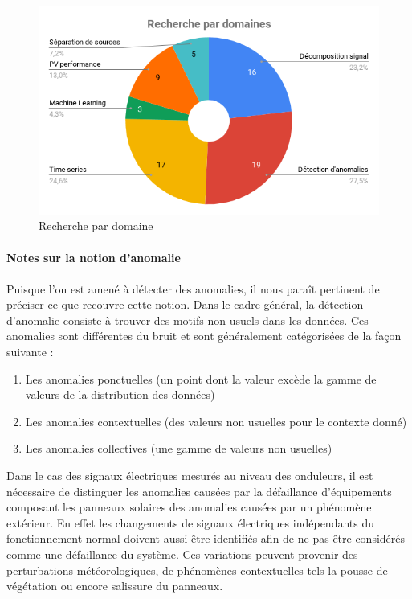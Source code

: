 \begin{figure}[!ht]
\begin{center}
\includegraphics[scale=0.5]{rapport/images/Ch3_RechercheParDomaines.png}
\end{center}
\caption{Recherche par domaine}
\label{fig: bibdo}
\end{figure}

\paragraph{Notes sur la notion d'anomalie}
\paragraph{}
Puisque l'on est amené à détecter des anomalies, il nous paraît pertinent de préciser ce que recouvre cette notion. Dans le cadre général, la détection d'anomalie consiste à trouver des motifs non usuels dans les données. Ces anomalies sont différentes du bruit et sont généralement catégorisées de la façon suivante :

\begin{enumerate}
\item Les anomalies ponctuelles (un point dont la valeur excède la gamme de valeurs de la distribution des données)
\item Les anomalies contextuelles (des valeurs non usuelles pour le contexte donné)
\item Les anomalies collectives (une gamme de valeurs non usuelles)
\end{enumerate}

Dans le cas des signaux électriques mesurés au niveau des onduleurs, il est nécessaire de distinguer les anomalies causées par la défaillance d'équipements composant les panneaux solaires des anomalies causées par un phénomène extérieur. En effet les changements de signaux électriques indépendants du fonctionnement normal doivent aussi être identifiés afin de ne pas être considérés comme une défaillance du système. Ces variations peuvent provenir des perturbations météorologiques, de phénomènes contextuelles tels la pousse de végétation ou encore salissure du panneaux.

